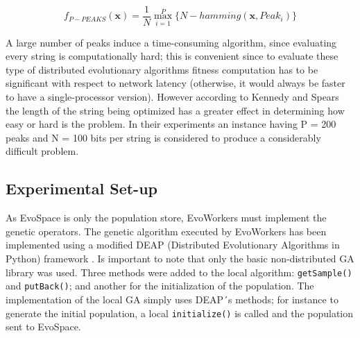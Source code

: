 \documentclass{llncs}
\begin{document}
\begin{equation}
f_{P-PEAKS}(\mathbf{x})=\frac{1}{N} \overset{P}{\max_{i=1}} \{N-hamming(\mathbf{x},Peak_i)   \}
\end{equation}

A large number of peaks induce a time-consuming algorithm,
since evaluating every string is computationally hard; this is
convenient since to evaluate these type of distributed evolutionary
algorithms fitness computation has to be significant with respect to
network latency (otherwise, it would always be faster to have a
single-processor version). However
according to Kennedy and Spears \cite{Kennedy:1998ch} the length of
the string being optimized has a greater effect in determining how
easy or hard is the problem. In their experiments an instance having P
= 200 peaks and N = 100 bits per string is considered to produce a
considerably difficult problem.

\subsection{Experimental Set-up}
As EvoSpace is only the population store, EvoWorkers must implement 
the genetic operators. The genetic algorithm executed by EvoWorkers has been implemented 
using a modified DEAP (Distributed Evolutionary Algorithms in Python) 
framework \cite{DEAP_JMLR2012}. Is important to note that only the basic non-distributed GA 
library was used. Three methods were added to the local algorithm: 
{ \tt  getSample()} and  {\tt putBack()}; and  another for the  initialization 
of the population. The implementation of the local GA simply uses DEAP´s methods; for instance to 
generate the initial population, a local {\tt initialize()} is called 
and the population sent to EvoSpace.
\end{document}
